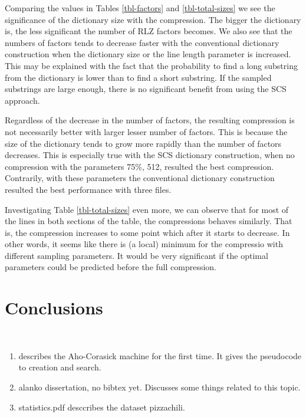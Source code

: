 \documentclass[english,twoside,censored,csm,algorithms-track-2020]{HYthesisML}
\theoremstyle{plain}
\theoremstyle{definition}
\begin{document}
Comparing the values in Tables \ref{tbl-factors} and \ref{tbl-total-sizes} we see the significance
of the dictionary size with the compression. The bigger the dictionary is, the less significant the
number of RLZ factors becomes. We also see that the numbers of factors tends to decrease faster
with the conventional dictionary construction when the dictionary size or the line length parameter
is increased. This may be explained with the fact that the probability to find a long substring from
the dictionary is lower than to find a short substring. If the sampled substrings are large enough,
there is no significant benefit from using the SCS approach.

Regardless of the decrease in the number of factors, the resulting compression is not necessarily
better with larger lesser number of factors. This is because the size of the dictionary tends to grow more
rapidly than the number of factors decreases. This is especially true with the SCS dictionary
construction, when no compression with the parameters 75\%, 512, resulted the best compression.
Contrarily, with these parameters the conventional dictionary construction resulted the best
performance with three files.

Investigating Table \ref{tbl-total-sizes} even more, we can observe that for most of the lines
in both sections of the table, the compressions behaves similarly. That is, the compression
increases to some point which after it starts to decrease. In other words, it seems like
there is (a local) minimum for the compressio with different sampling parameters.
It would be very significant if the optimal parameters could be predicted before the full compression.


\chapter{Conclusions}~\label{chp-conc}
  

  \begin{enumerate}
  \item \citep{Aho75} describes the Aho-Corasick machine for the first time. It gives the pseudocode to creation and search.
  \item alanko dissertation, no bibtex yet. Discusses some things related to this topic.
  \item statistics.pdf desccribes the dataset pizzachili.

  \end{enumerate}
\end{document}
